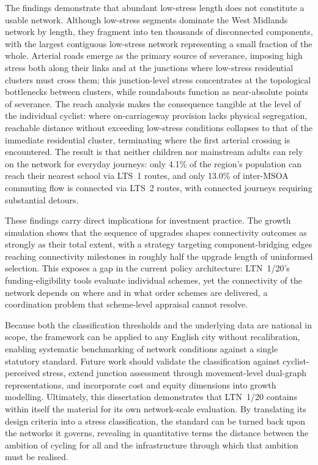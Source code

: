 The findings demonstrate that abundant low-stress length does not constitute a usable network. Although low-stress segments dominate the West Midlands network by length, they fragment into ten thousands of disconnected components, with the largest contiguous low-stress network representing a small fraction of the whole. Arterial roads emerge as the primary source of severance, imposing high stress both along their links and at the junctions where low-stress residential clusters must cross them; this junction-level stress concentrates at the topological bottlenecks between clusters, while roundabouts function as near-absolute points of severance. The reach analysis makes the consequence tangible at the level of the individual cyclist: where on-carriageway provision lacks physical segregation, reachable distance without exceeding low-stress conditions collapses to that of the immediate residential cluster, terminating where the first arterial crossing is encountered. The result is that neither children nor mainstream adults can rely on the network for everyday journeys: only 4.1\% of the region's population can reach their nearest school via LTS~1 routes, and only 13.0\% of inter-MSOA commuting flow is connected via LTS~2 routes, with connected journeys requiring substantial detours.

These findings carry direct implications for investment practice. The growth simulation shows that the sequence of upgrades shapes connectivity outcomes as strongly as their total extent, with a strategy targeting component-bridging edges reaching connectivity milestones in roughly half the upgrade length of uninformed selection. This exposes a gap in the current policy architecture: LTN~1/20's funding-eligibility tools evaluate individual schemes, yet the connectivity of the network depends on where and in what order schemes are delivered, a coordination problem that scheme-level appraisal cannot resolve.

Because both the classification thresholds and the underlying data are national in scope, the framework can be applied to any English city without recalibration, enabling systematic benchmarking of network conditions against a single statutory standard. Future work should validate the classification against cyclist-perceived stress, extend junction assessment through movement-level dual-graph representations, and incorporate cost and equity dimensions into growth modelling. Ultimately, this dissertation demonstrates that LTN~1/20 contains within itself the material for its own network-scale evaluation. By translating its design criteria into a stress classification, the standard can be turned back upon the networks it governs, revealing in quantitative terms the distance between the ambition of cycling for all and the infrastructure through which that ambition must be realised.
